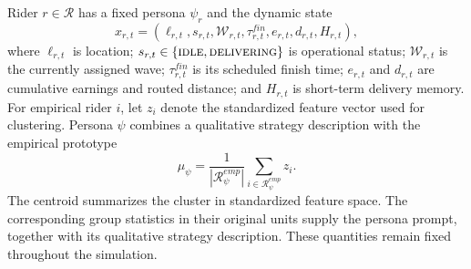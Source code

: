 \documentclass[letterpaper,journal]{IEEEtran}
\begin{document}
Rider $r\in\mathcal{R}$ has a fixed persona $\psi_r$ and the dynamic state
\begin{equation}
x_{r,t}=(\ell_{r,t},s_{r,t},\mathcal{W}_{r,t},
\tau_{r,t}^{fin},e_{r,t},d_{r,t},H_{r,t}),
\end{equation}
where $\ell_{r,t}$ is location; $s_{r,t}\in\{\textsc{idle},\textsc{delivering}\}$ is operational status; $\mathcal{W}_{r,t}$ is the currently assigned wave; $\tau_{r,t}^{fin}$ is its scheduled finish time; $e_{r,t}$ and $d_{r,t}$ are cumulative earnings and routed distance; and $H_{r,t}$ is short-term delivery memory. For empirical rider $i$, let $z_i$ denote the standardized feature vector used for clustering. Persona $\psi$ combines a qualitative strategy description with the empirical prototype
\begin{equation}
\mu_{\psi}=\frac{1}{|\mathcal{R}_{\psi}^{emp}|}
\sum_{i\in\mathcal{R}_{\psi}^{emp}}z_i .
\end{equation}
The centroid summarizes the cluster in standardized feature space. The corresponding group statistics in their original units supply the persona prompt, together with its qualitative strategy description. These quantities remain fixed throughout the simulation.
\end{document}
